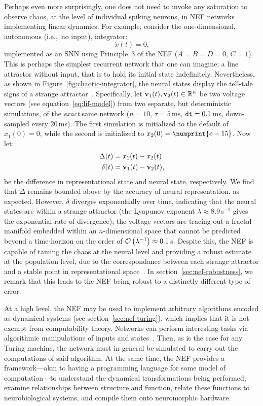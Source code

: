 Perhaps even more surprisingly, one does not need to invoke any saturation to observe chaos, at the level of individual spiking neurons, in NEF networks implementing linear dynamics.
For example, consider the one-dimensional, autonomous (i.e.,~no input), integrator:
$$\dot{x}(t) = 0 \text{,}$$
implemented as an SNN using Principle~3 of the NEF ($A = B = D = 0$, $C = 1$).
This is perhaps the simplest recurrent network that one can imagine; a line attractor without input, that is to hold its initial state indefinitely.
Nevertheless, as shown in Figure~\ref{fig:chaotic-integrator}, the neural states display the tell-tale signs of a strange attractor~\citep[cf.~][Figure~9.3.5]{strogatz2000nonlinear}.
Specifically, let $\mathbf{v}_1(t), \mathbf{v}_2(t) \in \mathbb{R}^n$ be two voltage vectors (see equation~\ref{eq:lif-model}) from two separate, but deterministic simulations, of the \emph{exact} same network ($n = 10$, $\tau = 5$\,ms, $\texttt{dt}{} = 0.1$\,ms, down-sampled every $20$\,ms).
The first simulation is initialized to the default of $x_1(0) = 0$, while the second is initialized to $x_2(0) = \numprint{e-15}$.
Now let:
\begin{align*}
\Delta(t) &= x_1(t) - x_2(t) \\
\delta(t) &= \mathbf{v}_1(t) - \mathbf{v}_2(t) \text{,}
\end{align*}
be the difference in representational state and neural state, respectively.
We find that $\Delta$ remains bounded above by the accuracy of neural representation, as expected.
However, $\delta$ diverges exponentially over time, indicating that the neural states are within a strange attractor (the Lyapunov exponent $\lambda \approx 8.9$\,s${}^{-1}$ gives the exponential rate of divergence); the voltage vectors are tracing out a fractal manifold embedded within an $n$-dimensional space that cannot be predicted beyond a time-horizon on the order of $\mathcal{O}\left({\lambda^{-1}}\right) \approx 0.1$\,s.
Despite this, the NEF is capable of taming the chaos at the neural level and providing a robust estimate at the population level, due to the correspondance between each strange attractor and a stable point in representational space~\citep[][p.~237]{eliasmith2003a}.
In section~\ref{sec:nef-robustness}, we remark that this leads to the NEF being robust to a distinctly different type of error.

At a high level, the NEF may be used to implement arbitrary algorithms encoded as dynamical systems (see section~\ref{sec:nef-turing}), which implies that it is not exempt from computability theory. 
Networks can perform interesting tasks via algorithmic manipulations of inputs and states~\citep{choo2018}.
Then, as is the case for any Turing machine, the network must in general be simulated to carry out the computations of said algorithm.
At the same time, the NEF provides a framework---akin to having a programming language for some model of computation---to understand the dynamical transformations being performed, examine relationships between structure and function, relate these functions to neurobiological systems, and compile them onto neuromorphic hardware.

